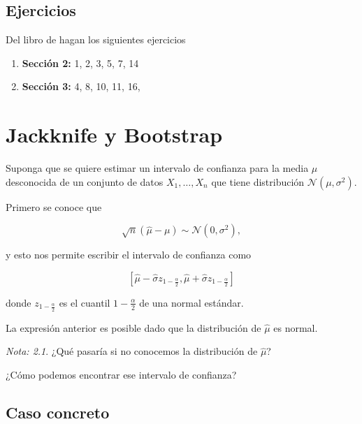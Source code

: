 \documentclass[
  12pt,
]{book}
\providecommand{\tightlist}{%
  \setlength{\itemsep}{0pt}\setlength{\parskip}{0pt}}
\theoremstyle{definition}
\theoremstyle{definition}
\theoremstyle{definition}
\theoremstyle{definition}
\theoremstyle{remark}
\newtheorem*{remark}{Nota: }
\begin{document}
\hypertarget{ejercicios}{%
\section{Ejercicios}\label{ejercicios}}

Del libro de \autocite{HardleNonparametric2004} hagan los siguientes ejercicios

\begin{enumerate}
\def\labelenumi{\arabic{enumi}.}
\tightlist
\item
  \textbf{Sección 2:} 1, 2, 3, 5, 7, 14
\item
  \textbf{Sección 3:} 4, 8, 10, 11, 16,
\end{enumerate}

\hypertarget{jackknife-y-bootstrap}{%
\chapter{Jackknife y Bootstrap}\label{jackknife-y-bootstrap}}

Suponga que se quiere estimar un intervalo de confianza para la media
\(\mu\) desconocida de un conjunto de datos \(X_{1},\ldots, X_{n}\)
que tiene distribución \(\mathcal{N}\left(\mu ,\sigma^{2}\right)\).

Primero se conoce que

\begin{equation*}
\sqrt{n}\left( \hat{\mu} - \mu \right)
\sim \mathcal{N}\left(0,\sigma^{2}\right),
\end{equation*}

y esto nos permite escribir el intervalo de confianza como

\begin{equation*}
\left[ \hat{\mu} - \hat{\sigma}z_{1-\frac{\alpha}{2}} ,
\hat{\mu} + \hat{\sigma}z_{1-\frac{\alpha}{2}}\right]
\end{equation*}

donde \(z_{1-\frac{\alpha}{2}}\) es el cuantil \(1-\frac{\alpha}{2}\)
de una normal estándar.

La expresión anterior es posible dado que la distribución de \(\hat{\mu}\) es normal.

\begin{remark}
¿Qué pasaría si no conocemos la distribución de \(\hat{\mu}\)?

¿Cómo podemos encontrar ese intervalo de confianza?
\end{remark}

\hypertarget{caso-concreto}{%
\section{Caso concreto}\label{caso-concreto}}
\end{document}

